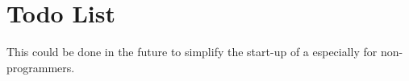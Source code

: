 \chapter{Todo List}
\hypertarget{todo}{}\label{todo}

\begin{DoxyRefList}
\item[Member \doxylink{class_load_cell_controller_a6085bd3ff4f5ac988817f2d48bd21697}{Load\+Cell\+Controller\+::easy\+\_\+start\+\_\+with\+\_\+questions} (byte loadcell\+\_\+num, byte dout, byte pd\+\_\+sck, byte gain=128)]\label{todo__todo000001}%
%
This could be done in the future to simplify the start-\/up of a  especially for non-\/programmers.
\end{DoxyRefList}